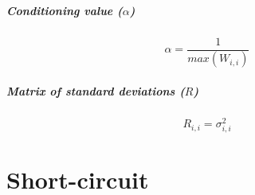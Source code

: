 \documentclass[nols,a4paper,twoside,notoc,fleqn]{tufte-book}
\begin{document}
\paragraph{Conditioning value ($\alpha$)}

\begin{equation}
\alpha = \frac{1}{max(W_{i, i})}
\end{equation}


\paragraph{Matrix of standard deviations ($R$)}

\begin{equation}
R_{i, i} = \sigma_{i, i}^2
\end{equation}


\chapter{Short-circuit}





\backmatter





\printindex
\end{document}

